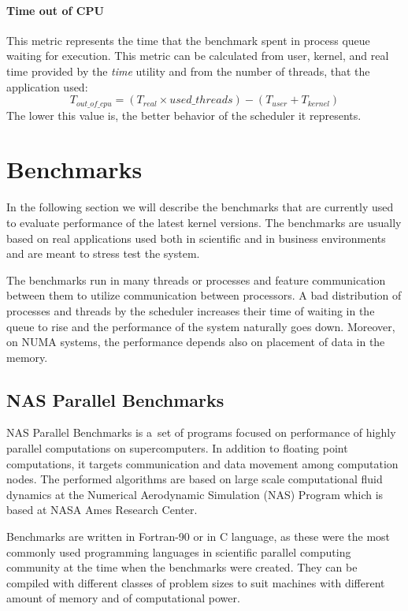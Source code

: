 \paragraph{Time out of CPU} This metric represents the time that the benchmark spent in process
queue waiting for execution. This metric can be calculated from user, kernel, and
real time provided by the \emph{time} utility and from the number of threads, that the
application used:
$$T_{out\_of\_cpu} = (T_{real} \times used\_threads) - (T_{user} + T_{kernel})$$
The lower this value is, the better behavior of the scheduler it represents.

\section{Benchmarks}
In the following section we will describe the benchmarks that are currently used
to evaluate performance of the latest kernel versions. The benchmarks are
usually based on real applications used both in scientific and in business
environments and are meant to stress test the system.

The benchmarks run in many threads or processes and feature communication
between them to utilize communication between processors. A bad distribution of
processes and threads by the scheduler increases their time of waiting in the
queue to rise and the performance of the system naturally goes down. Moreover,
on NUMA systems, the performance depends also on placement of data in the
memory.

\subsection{NAS Parallel Benchmarks}
NAS Parallel Benchmarks\;\cite{nas-parallel} is a~set of programs focused on
performance of highly parallel computations on supercomputers. In addition to
floating point computations, it targets communication and data movement among
computation nodes. The performed algorithms are based on large scale
computational fluid dynamics at the Numerical Aerodynamic Simulation (NAS)
Program which is based at NASA Ames Research Center.

Benchmarks are written in Fortran-90 or in C language, as these were the most
commonly used programming languages in scientific parallel computing community
at the time when the benchmarks were created. They can be compiled with
different classes of problem sizes to suit machines with different amount of
memory and of computational power.

